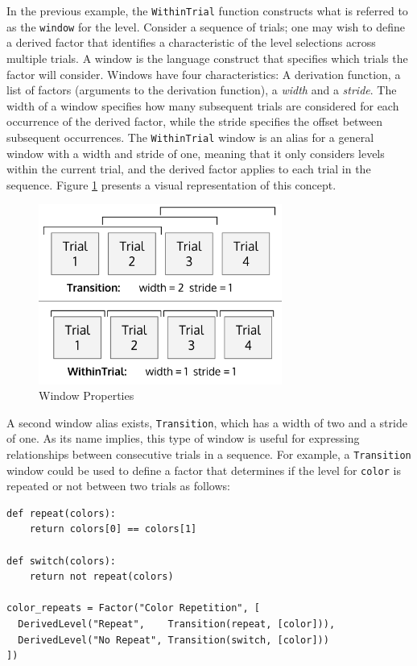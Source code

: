 In the previous example, the \texttt{WithinTrial} function constructs what is referred to as the \texttt{window} for the level. Consider a sequence of trials; one may wish to define a derived factor that identifies a characteristic of the level selections across multiple trials. A window is the language construct that specifies which trials the factor will consider. Windows have four characteristics: A derivation function, a list of factors (arguments to the derivation function), a \textit{width} and a \textit{stride}. The width of a window specifies how many subsequent trials are considered for each occurrence of the derived factor, while the stride specifies the offset between subsequent occurrences. The \texttt{WithinTrial} window is an alias for a general window with a width and stride of one, meaning that it only considers levels within the current trial, and the derived factor applies to each trial in the sequence. Figure \ref{fig:windows} presents a visual representation of this concept.

\begin{figure}[htb]
\centering
\centerline{\includegraphics[origin=c,width=8cm]{../figures/windows.png}}
\caption{Window Properties}
\label{fig:windows}
\end{figure}

A second window alias exists, \texttt{Transition}, which has a width of two and a stride of one. As its name implies, this type of window is useful for expressing relationships between consecutive trials in a sequence. For example, a \texttt{Transition} window could be used to define a factor that determines if the level for \texttt{color} is repeated or not between two trials as follows:

\begin{verbatim}
def repeat(colors):
    return colors[0] == colors[1]

def switch(colors):
    return not repeat(colors)

color_repeats = Factor("Color Repetition", [
  DerivedLevel("Repeat",    Transition(repeat, [color])),
  DerivedLevel("No Repeat", Transition(switch, [color]))
])
\end{verbatim}

